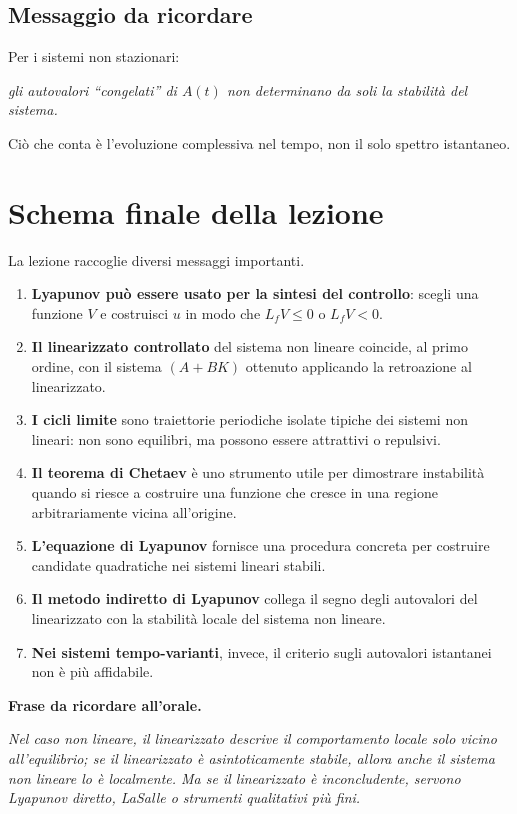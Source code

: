 \subsection{Messaggio da ricordare}

Per i sistemi non stazionari:
\begin{center}
\emph{gli autovalori ``congelati'' di \(A(t)\) non determinano da soli la stabilit\`a del sistema.}
\end{center}

Ci\`o che conta \`e l'evoluzione complessiva nel tempo, non il solo spettro istantaneo.

\section{Schema finale della lezione}

La lezione raccoglie diversi messaggi importanti.

\begin{enumerate}
    \item \textbf{Lyapunov pu\`o essere usato per la sintesi del controllo}: scegli una funzione \(V\) e costruisci \(u\) in modo che \(L_fV\le 0\) o \(L_fV<0\).
    
    \item \textbf{Il linearizzato controllato} del sistema non lineare coincide, al primo ordine, con il sistema \((A+BK)\) ottenuto applicando la retroazione al linearizzato.

    \item \textbf{I cicli limite} sono traiettorie periodiche isolate tipiche dei sistemi non lineari: non sono equilibri, ma possono essere attrattivi o repulsivi.

    \item \textbf{Il teorema di Chetaev} \`e uno strumento utile per dimostrare instabilit\`a quando si riesce a costruire una funzione che cresce in una regione arbitrariamente vicina all'origine.

    \item \textbf{L'equazione di Lyapunov} fornisce una procedura concreta per costruire candidate quadratiche nei sistemi lineari stabili.

    \item \textbf{Il metodo indiretto di Lyapunov} collega il segno degli autovalori del linearizzato con la stabilit\`a locale del sistema non lineare.

    \item \textbf{Nei sistemi tempo-varianti}, invece, il criterio sugli autovalori istantanei non \`e pi\`u affidabile.
\end{enumerate}

\medskip

\noindent
\textbf{Frase da ricordare all'orale.}
\begin{center}
\emph{Nel caso non lineare, il linearizzato descrive il comportamento locale solo vicino all'equilibrio; se il linearizzato \`e asintoticamente stabile, allora anche il sistema non lineare lo \`e localmente. Ma se il linearizzato \`e inconcludente, servono Lyapunov diretto, LaSalle o strumenti qualitativi pi\`u fini.}
\end{center}
